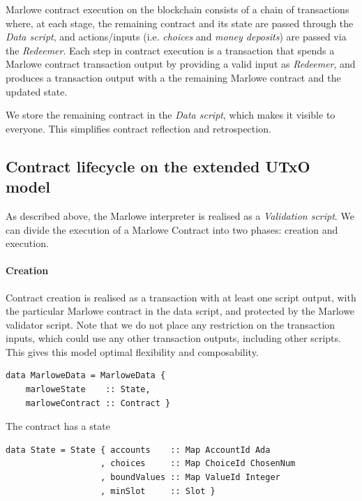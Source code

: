 \documentclass[runningheads]{llncs}
\begin{document}
\noindent
Marlowe contract execution on the blockchain consists of a chain of transactions
where, at each stage, the remaining contract and its state are passed through the \emph{Data script},
and actions/inputs (i.e. \emph{choices} and \emph{money deposits}) are passed via the 
\emph{Redeemer}.
Each step in contract execution is a transaction that spends a Marlowe contract transaction output
by providing a valid input as \emph{Redeemer}, and produces a transaction output
with a the remaining Marlowe contract and the updated state.

We store the remaining contract in the \emph{Data script}, which makes it visible to everyone.
This simplifies contract reflection and retrospection.

\subsection{Contract lifecycle on the extended UTxO model}

As described above, the Marlowe interpreter is realised as a \emph{Validation script}.
We can divide the execution of a Marlowe Contract into two phases:
creation and execution.

\paragraph{Creation}

Contract creation is realised as a transaction
with at least one script output,
with the particular Marlowe contract in the data script, and protected by the Marlowe validator script.
Note that we do not place any restriction on the transaction inputs, which could use any other transaction
outputs, including other scripts. This gives this model optimal flexibility and composability.

\begin{verbatim}
data MarloweData = MarloweData {
    marloweState    :: State,
    marloweContract :: Contract }
\end{verbatim}
\noindent
The contract has a state

\begin{verbatim}
data State = State { accounts    :: Map AccountId Ada
                   , choices     :: Map ChoiceId ChosenNum
                   , boundValues :: Map ValueId Integer
                   , minSlot     :: Slot }
\end{verbatim}
\end{document}
